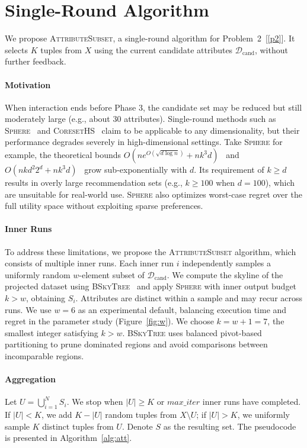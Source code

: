 \section{Single-Round Algorithm}
\label{sec:attsub}

We propose \textsc{AttributeSubset}, a single-round algorithm for Problem~2~[\ref{p2}]. It selects $K$ tuples from $X$ using the current candidate attributes $\mathcal{D}_\text{cand}$, without further feedback.

\paragraph{\textbf{Motivation}}
When interaction ends before Phase 3, the candidate set may be reduced but still moderately large (e.g., about $30$ attributes). Single-round methods such as \textsc{Sphere}~\cite{XW18} and \textsc{CoresetHS}~\cite{kumar2018faster} claim to be applicable to any dimensionality, but their performance degrades severely in high-dimensional settings. Take \textsc{Sphere} for example, the theoretical bounds $O(n e^{O(\sqrt{d \log n})} + nk^3d)$~\cite{Gar95} and $O(nkd^2 2^d + nk^3d)$~\cite{SW92} grow sub-exponentially with $d$. Its requirement of $k\geq d$ results in overly large recommendation sets (e.g., $k \ge 100$ when $d = 100$), which are unsuitable for real-world use. \textsc{Sphere} also optimizes worst-case regret over the full utility space without exploiting sparse preferences.

\paragraph{\textbf{Inner Runs}}
To address these limitations, we propose the \textsc{AttributeSubset} algorithm, which consists of multiple inner runs. Each inner run $i$ independently samples a uniformly random $w$-element subset of $\mathcal{D}_\text{cand}$. We compute the skyline of the projected dataset using \textsc{BSkyTree}~\cite{bskytree} and apply \textsc{Sphere} with inner output budget $k>w$, obtaining $S_i$. Attributes are distinct within a sample and may recur across runs. We use $w=6$ as an experimental default, balancing execution time and regret in the parameter study (Figure~\ref{fig:w}). We choose $k=w+1=7$, the smallest integer satisfying $k>w$. \textsc{BSkyTree} uses balanced pivot-based partitioning to prune dominated regions and avoid comparisons between incomparable regions.

\paragraph{\textbf{Aggregation}}
Let $U=\bigcup_{i=1}^{N}S_i$. We stop when $\lvert U\rvert\geq K$ or $max\_iter$ inner runs have completed. If $\lvert U\rvert<K$, we add $K-\lvert U\rvert$ random tuples from $X\setminus U$; if $\lvert U\rvert>K$, we uniformly sample $K$ distinct tuples from $U$. Denote $S$ as the resulting set. The pseudocode is presented in Algorithm~\ref{alg:att}.

